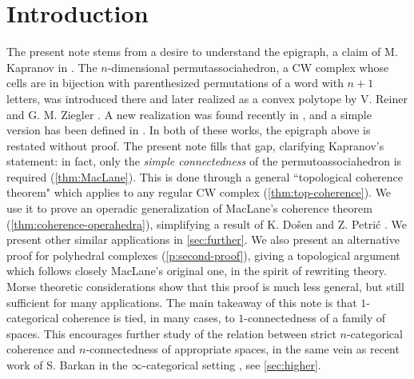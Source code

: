 
\section*{Introduction} 
\label{s:introduction}

The present note stems from a desire to understand the epigraph, a claim of M. Kapranov in \cite{kapranov1993}. 
The $n$-dimensional permutassociahedron, a CW complex whose cells are in bijection with parenthesized permutations of a word with $n+1$ letters, was introduced there and later realized as a convex polytope by V. Reiner and G. M. Ziegler \cite{reinerCoxeterassociahedra1994}. 
A new realization was found recently in \cite{CastilloLiu21}, and a simple version has been defined in \cite{baralicSimplePermutoassociahedron2019}.
In both of these works, the epigraph above is restated without proof. 
The present note fills that gap, clarifying Kapranov's statement: in fact, only the \emph{simple connectedness} of the permutoassociahedron is required (\cref{thm:MacLane}).
This is done through a general ``topological coherence theorem" which applies to any regular CW complex (\cref{thm:top-coherence}).
We use it to prove an operadic generalization of MacLane's coherence theorem (\cref{thm:coherence-operahedra}), simplifying a result of K. Do{\v s}en and Z. Petri{\'c} \cite{DP15}.
We present other similar applications in \cref{sec:further}. 
We also present an alternative proof for polyhedral complexes (\cref{p:second-proof}), giving a topological argument which follows closely MacLane's original one, in the spirit of rewriting theory. 
Morse theoretic considerations show that this proof is much less general, but still sufficient for many applications.
The main takeaway of this note is that $1$-categorical coherence is tied, in many cases, to $1$-connectedness of a family of spaces. 
This encourages further study of the relation between strict $n$-categorical coherence and $n$-connectedness of appropriate spaces, in the same vein as recent work of S. Barkan in the $\infty$-categorical setting \cite{barkanArityApproximationInfty2022}, see \cref{sec:higher}.



